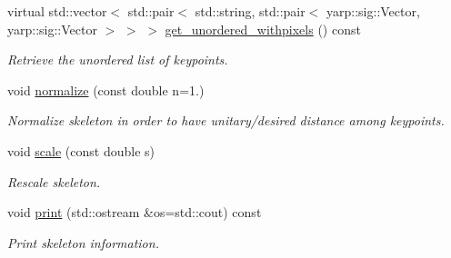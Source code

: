 \begin{DoxyCompactItemize}
virtual std\+::vector$<$ std\+::pair$<$ std\+::string, std\+::pair$<$ yarp\+::sig\+::\+Vector, yarp\+::sig\+::\+Vector $>$ $>$ $>$ \mbox{\hyperlink{classassistive__rehab_1_1Skeleton_a513a3dc56d55a7b10b256378ae63c6c7}{get\+\_\+unordered\+\_\+withpixels}} () const
\begin{DoxyCompactList}\small\item\em Retrieve the unordered list of keypoints. \end{DoxyCompactList}\item 
void \mbox{\hyperlink{classassistive__rehab_1_1Skeleton_a7753cc8d2b43e27eaf7bf9ef640a99cb}{normalize}} (const double n=1.)
\begin{DoxyCompactList}\small\item\em Normalize skeleton in order to have unitary/desired distance among keypoints. \end{DoxyCompactList}\item 
void \mbox{\hyperlink{classassistive__rehab_1_1Skeleton_a21fded128e2240e4dd507030b7386670}{scale}} (const double s)
\begin{DoxyCompactList}\small\item\em Rescale skeleton. \end{DoxyCompactList}\item 
\mbox{\label{classassistive__rehab_1_1Skeleton_a58289ea0ba49220afac3e8d7128493b4}} 
void \mbox{\hyperlink{classassistive__rehab_1_1Skeleton_a58289ea0ba49220afac3e8d7128493b4}{print}} (std\+::ostream \&os=std\+::cout) const
\begin{DoxyCompactList}\small\item\em Print skeleton information. \end{DoxyCompactList}\end{DoxyCompactItemize}
